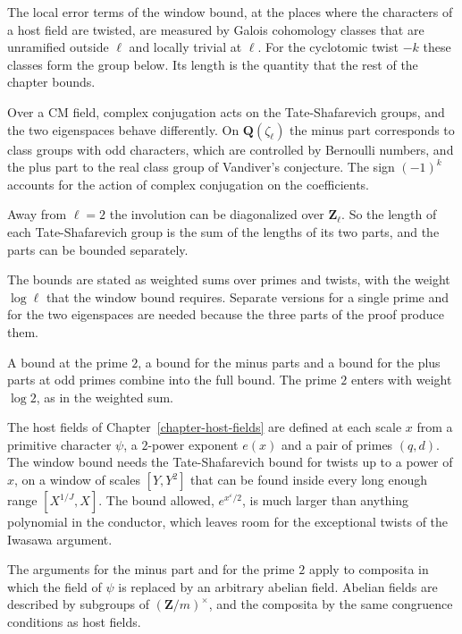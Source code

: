 The local error terms of the window bound, at the places where the characters of a host field are twisted, are measured by Galois cohomology classes that are unramified outside $\ell$ and locally trivial at $\ell$. For the cyclotomic twist $-k$ these classes form the group below. Its length is the quantity that the rest of the chapter bounds.

Over a CM field, complex conjugation acts on the Tate-Shafarevich groups, and the two eigenspaces behave differently. On $\mathbf Q(\zeta_\ell)$ the minus part corresponds to class groups with odd characters, which are controlled by Bernoulli numbers, and the plus part to the real class group of Vandiver's conjecture. The sign $(-1)^k$ accounts for the action of complex conjugation on the coefficients.

Away from $\ell=2$ the involution can be diagonalized over $\mathbf Z_\ell$. So the length of each Tate-Shafarevich group is the sum of the lengths of its two parts, and the parts can be bounded separately.

The bounds are stated as weighted sums over primes and twists, with the weight $\log\ell$ that the window bound requires. Separate versions for a single prime and for the two eigenspaces are needed because the three parts of the proof produce them.

A bound at the prime $2$, a bound for the minus parts and a bound for the plus parts at odd primes combine into the full bound. The prime $2$ enters with weight $\log2$, as in the weighted sum.

The host fields of Chapter~\ref{chapter-host-fields} are defined at each scale $x$ from a primitive character $\psi$, a $2$-power exponent $e(x)$ and a pair of primes $(q,d)$. The window bound needs the Tate-Shafarevich bound for twists up to a power of $x$, on a window of scales $[Y,Y^2]$ that can be found inside every long enough range $[X^{1/J},X]$. The bound allowed, $e^{x^{\varepsilon}/2}$, is much larger than anything polynomial in the conductor, which leaves room for the exceptional twists of the Iwasawa argument.

The arguments for the minus part and for the prime $2$ apply to composita in which the field of $\psi$ is replaced by an arbitrary abelian field. Abelian fields are described by subgroups of $(\mathbf Z/m)^\times$, and the composita by the same congruence conditions as host fields.

